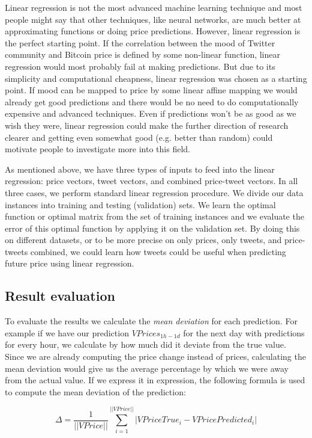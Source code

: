 \documentclass[a4paper,11pt,oneside]{article}
\begin{document}
  Linear regression is not the most advanced machine learning technique and most people might say that other techniques, like neural networks, are much better at approximating functions or doing price predictions. However, linear regression is the perfect starting point. If the correlation between the mood of Twitter community and Bitcoin price is defined by some non-linear function, linear regression would most probably fail at making predictions. But due to its simplicity and computational cheapness, linear regression was chosen as a starting point. If mood can be mapped to price by some linear affine mapping we would already get good predictions and there would be no need to do computationally expensive and advanced techniques. Even if predictions won’t be as good as we wish they were, linear regression could make the further direction of research clearer and getting even somewhat good (e.g. better than random) could motivate people to investigate more into this field. 
  
  As mentioned above, we have three types of inputs to feed into the linear regression: price vectors, tweet vectors, and combined price-tweet vectors. In all three cases, we perform standard linear regression procedure. We divide our data instances into training and testing (validation) sets. We learn the optimal function or optimal matrix from the set of training instances and we evaluate the error of this optimal function by applying it on the validation set. By doing this on different datasets, or to be more precise on only prices, only tweets, and price-tweets combined, we could learn how tweets could be useful when predicting future price using linear regression.
  
  \subsection{Result evaluation}
  
  To evaluate the results we calculate the {\it mean deviation} for each prediction. For example if we have our prediction $VPrices_{1h-1d}$ for the next day with predictions for every hour, we calculate by how much did it deviate from the true value. Since we are already computing the price change instead of prices, calculating the mean deviation would give us the average percentage by which we were away from the actual value. If we express it in expression, the following formula is used to compute the mean deviation of the prediction:
  
 \begin{equation}\label{meandeviation}
 	\Delta = \frac{1}{||VPrice||} \sum_{i = 1}^{||VPrice||} |VPriceTrue_i - VPricePredicted_i|
 \end{equation}
 
\end{document}
